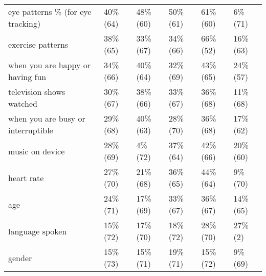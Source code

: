 \documentclass[a4paper,12pt]{article}
\begin{document}
\begin{longtable}{| p{7cm} | l | l | l | l | l |}
eye patterns \% (for eye tracking) & 40\% (64) & 48\% (60) & 50\% (61) & 61\% (60) & 6\% (71) \\ 
exercise patterns & 38\% (65) & 33\% (67) & 34\% (66) & 66\% (52) & 16\% (63) \\ 
when you are happy or having fun & 34\% (66) & 40\% (64) & 32\% (69) & 43\% (65) & 24\% (57) \\ 
television shows watched & 30\% (67) & 38\% (66) & 33\% (67) & 36\% (68) & 11\% (68) \\ 
when you are busy or interruptible & 29\% (68) & 40\% (63) & 28\% (70) & 36\% (68) & 17\% (62) \\ 
music on device & 28\% (69) & 4\% (72) & 37\% (64) & 42\% (66) & 20\% (60) \\ 
heart rate & 27\% (70) & 21\% (68) & 36\% (65) & 44\% (64) & 9\% (70) \\ 
age & 24\% (71) & 17\% (69) & 33\% (67) & 36\% (67) & 14\% (65) \\ 
language spoken & 15\% (72) & 17\% (70) & 18\% (72) & 28\% (70) & 27\% (2) \\ 
gender & 15\% (73) & 15\% (71) & 19\% (71) & 15\% (72) & 9\% (69) \\ 
\end{longtable}
\end{document}

